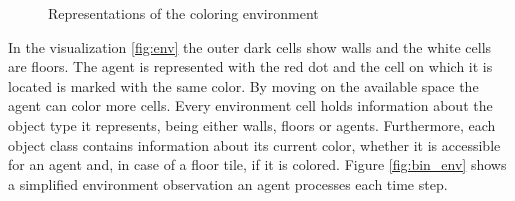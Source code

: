 \begin{figure}[hpbt]
    \centering
    \hspace{0.01\textwidth}
    \caption[Coloring Environment]{Representations of the coloring environment}
    \label{fig:multipic_env} %
\end{figure}

In the visualization \ref{fig:env} the outer dark cells show walls and the white cells are floors. The agent is represented with the red dot and the cell on which it is located is marked with the same color. By moving on the available space the agent can color more cells.  Every environment cell holds information about the object type it represents, being either walls, floors or agents. Furthermore, each object class contains information about its current color, whether it is accessible for an agent and, in case of a floor tile, if it is colored. Figure \ref{fig:bin_env} shows a simplified environment observation an agent processes each time step.

